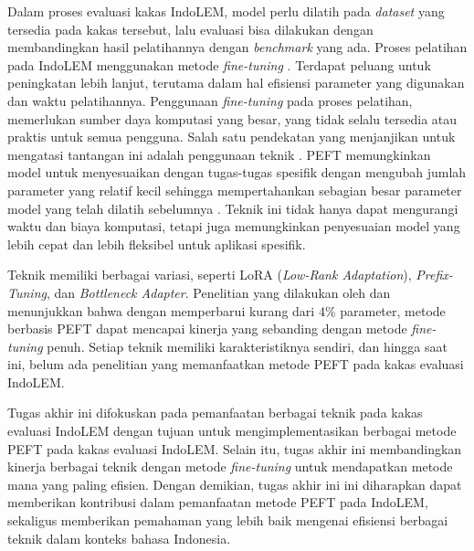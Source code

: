 Dalam proses evaluasi kakas IndoLEM, model perlu dilatih pada \textit{dataset} yang tersedia pada kakas tersebut, lalu evaluasi bisa dilakukan dengan membandingkan hasil pelatihannya dengan \textit{benchmark} yang ada. Proses pelatihan pada IndoLEM menggunakan metode \textit{fine-tuning} \parencite{indolem}. Terdapat peluang untuk peningkatan lebih lanjut, terutama dalam hal efisiensi parameter yang digunakan dan waktu pelatihannya. Penggunaan \textit{fine-tuning} pada proses pelatihan, memerlukan sumber daya komputasi yang besar, yang tidak selalu tersedia atau praktis untuk semua pengguna. Salah satu pendekatan yang menjanjikan untuk mengatasi tantangan ini adalah penggunaan teknik \PEFT. PEFT memungkinkan model untuk menyesuaikan dengan tugas-tugas spesifik dengan mengubah jumlah parameter yang relatif kecil sehingga mempertahankan sebagian besar parameter model yang telah dilatih sebelumnya \parencite{adapter_houlsby}. Teknik ini tidak hanya dapat mengurangi waktu dan biaya komputasi, tetapi juga memungkinkan penyesuaian model yang lebih cepat dan lebih fleksibel untuk aplikasi spesifik. 

Teknik \PEFT memiliki berbagai variasi, seperti LoRA (\textit{Low-Rank Adaptation}), \textit{Prefix-Tuning}, dan \textit{Bottleneck Adapter}. Penelitian yang dilakukan oleh \citeauthor{adapter_houlsby} \parencite{adapter_houlsby} dan \citeauthor{uvpl} \parencite{uvpl} menunjukkan bahwa dengan memperbarui kurang dari 4\% parameter, metode berbasis PEFT dapat mencapai kinerja yang sebanding dengan metode \textit{fine-tuning} penuh. Setiap teknik memiliki karakteristiknya sendiri, dan hingga saat ini, belum ada penelitian yang memanfaatkan metode PEFT pada kakas evaluasi IndoLEM.

Tugas akhir ini  difokuskan pada pemanfaatan berbagai teknik \PEFT pada kakas evaluasi IndoLEM dengan tujuan untuk mengimplementasikan berbagai metode PEFT pada kakas evaluasi IndoLEM. Selain itu, tugas akhir ini  membandingkan kinerja berbagai teknik \PEFT dengan metode \textit{fine-tuning}  untuk mendapatkan metode mana yang paling efisien. Dengan demikian, tugas akhir ini ini diharapkan dapat memberikan kontribusi dalam pemanfaatan metode PEFT pada IndoLEM, sekaligus memberikan pemahaman yang lebih baik mengenai efisiensi berbagai teknik \PEFT dalam konteks bahasa Indonesia.
